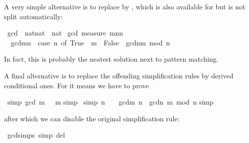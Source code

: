 \begin{isabellebody}
\begin{isamarkuptext}
A very simple alternative is to replace  by , which
is also available for  but is not split automatically:%
\end{isamarkuptext}%
\ gcd\ {\isacharcolon}{\isacharcolon}\ {\isachardoublequote}nat{\isasymtimes}nat\ {\isasymRightarrow}\ nat{\isachardoublequote}\isanewline
{}\ gcd\ {\isachardoublequote}measure\ {\isacharparenleft}{\isasymlambda}{\isacharparenleft}m{\isacharcomma}n{\isacharparenright}{\isachardot}n{\isacharparenright}{\isachardoublequote}\isanewline
\ \ {\isachardoublequote}gcdm{\isacharcomma}n{\isacharparenright}\ {\isacharequal}\ {\isacharparenleft}case\ n{\isacharequal}\ of\ True\ {\isasymRightarrow}\ m\ {\isacharbar}\ False\ {\isasymRightarrow}\ gcdn{\isacharcomma}m\ mod\ n{\isacharparenright}{\isacharparenright}{\isachardoublequote}%
\begin{isamarkuptext}%
\noindent
In fact, this is probably the neatest solution next to pattern matching.

A final alternative is to replace the offending simplification rules by
derived conditional ones. For  it means we have to prove%
\end{isamarkuptext}%
\ {\isacharbrackleft}simp{\isacharbrackright}{\isacharcolon}\ {\isachardoublequote}gcd\ {\isacharparenleft}m{\isacharcomma}\ \ {\isacharequal}\ m{\isachardoublequote}\isanewline
{}simp{\isacharparenright}\isanewline
{}\isanewline
{}\ {\isacharbrackleft}simp{\isacharbrackright}{\isacharcolon}\ {\isachardoublequote}n\ {\isasymnoteq}\ \ {\isasymLongrightarrow}\ gcd{\isacharparenleft}m{\isacharcomma}\ n{\isacharparenright}\ {\isacharequal}\ gcd{\isacharparenleft}n{\isacharcomma}\ m\ mod\ n{\isacharparenright}{\isachardoublequote}\isanewline
{}simp{\isacharparenright}\isanewline
{}%
\begin{isamarkuptext}%
\noindent
after which we can disable the original simplification rule:%
\end{isamarkuptext}%
\ gcd{\isachardot}simps\ {\isacharbrackleft}simp\ del{\isacharbrackright}\isanewline
\end{isabellebody}%
